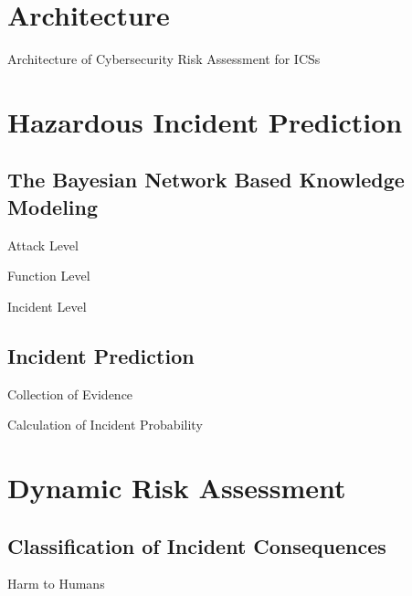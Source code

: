 \documentclass[10pt, compress]{beamer}
\begin{document}
\section{Architecture}
\begin{frame}{Architecture of Cybersecurity Risk Assessment for ICSs}
    \begin{center}
        
    \end{center}
\end{frame}
\fi

\section{Hazardous Incident Prediction}
\subsection{The Bayesian Network Based Knowledge Modeling}
\begin{frame}{Attack Level}
\end{frame}

\begin{frame}{Function Level}
\end{frame}

\begin{frame}{Incident Level}
\end{frame}

\subsection{Incident Prediction}
\begin{frame}{Collection of Evidence}
\end{frame}

\begin{frame}{Calculation of Incident Probability}
\end{frame}

\section{Dynamic Risk Assessment}
\subsection{Classification of Incident Consequences}
\begin{frame}{Harm to Humans}
\end{frame}
\end{document}
